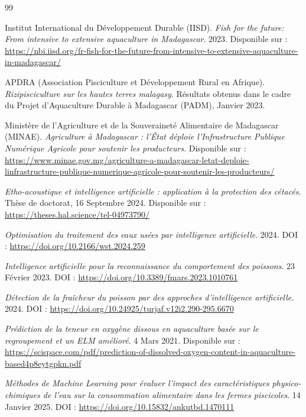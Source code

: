 \documentclass[a4paper,12pt, oneside]{article}
\begin{document}
\renewcommand{\refname}{Bibliographie}
\begin{thebibliography}{99}

Institut International du Développement Durable (IISD).
\newline \textit{Fish for the future: From intensive to extensive aquaculture in Madagascar}. 2023. Disponible sur : \url{https://nbi.iisd.org/fr-fish-for-the-future-from-intensive-to-extensive-aquaculture-in-madagascar/}

APDRA (Association Pisciculture et Développement Rural en Afrique).
\newline \textit{Rizipisciculture sur les hautes terres malagasy}. Résultats obtenus dans le cadre du Projet d'Aquaculture Durable à Madagascar (PADM), Janvier 2023.

Ministère de l'Agriculture et de la Souveraineté Alimentaire de Madagascar (MINAE).
\newline \textit{Agriculture à Madagascar : l'État déploie l'Infrastructure Publique Numérique Agricole pour soutenir les producteurs}. Disponible sur : \url{https://www.minae.gov.mg/agriculture-a-madagascar-letat-deploie-linfrastructure-publique-numerique-agricole-pour-soutenir-les-producteurs/}

\textit{Etho-acoustique et intelligence artificielle : application à la protection des cétacés}. Thèse de doctorat, 16 Septembre 2024. Disponible sur : \url{https://theses.hal.science/tel-04973790/}

\textit{Optimisation du traitement des eaux usées par intelligence artificielle}. 2024. DOI : \url{https://doi.org/10.2166/wst.2024.259}

\textit{Intelligence artificielle pour la reconnaissance du comportement des poissons}. 23 Février 2023. DOI : \url{https://doi.org/10.3389/fmars.2023.1010761}

\textit{Détection de la fraîcheur du poisson par des approches d'intelligence artificielle}. 2024. DOI : \url{https://doi.org/10.24925/turjaf.v12i2.290-295.6670}

\textit{Prédiction de la teneur en oxygène dissous en aquaculture basée sur le regroupement et un ELM amélioré}. 4 Mars 2021. Disponible sur : \url{https://scispace.com/pdf/prediction-of-dissolved-oxygen-content-in-aquaculture-based4p8eytgpkn.pdf}

\textit{Méthodes de Machine Learning pour évaluer l'impact des caractéristiques physico-chimiques de l'eau sur la consommation alimentaire dans les fermes piscicoles}. 14 Janvier 2025. DOI : \url{https://doi.org/10.15832/ankutbd.1470111}


\end{thebibliography}
\end{document}
